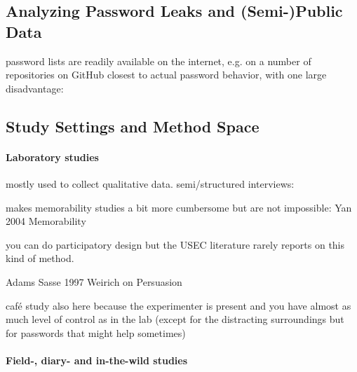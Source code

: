 \subsection{Analyzing Password Leaks and (Semi-)Public Data}
password lists are readily available on the internet, e.g. on a number of repositories on GitHub
closest to actual password behavior, with one large disadvantage: 
\cite{Bonneau2012LinguisticProperties}
\cite{Bonneau2012ScienceOfGuessing}
\cite{Veras2012VisualizingSemanticsPasswords}
\cite{Wash2016UnderstandingPasswordChoices}

\subsection{Study Settings and Method Space}

\paragraph{Laboratory studies}
mostly used to collect qualitative data.
semi/structured interviews: \cite{Stobert2014PasswordLifeCycle}

makes memorability studies a bit more cumbersome but are not impossible:
Yan 2004 Memorability \cite{Yan2004PasswordMemorabilitySecurity}


you can do participatory design \cite{Kuhn1993ParticipatoryDesign} but the USEC literature rarely reports on this kind of method.

Adams Sasse 1997 \cite{Adams1997MakingPWsSecureAndUsable}
Weirich on Persuasion \cite{Weirich2001PrettyGoodPersuasion, Weirich2005PersuasivePasswordSecurity}

café study also here because the experimenter is present and you have almost as much level of control as in the lab (except for the distracting surroundings but for passwords that might help sometimes)
\cite{VonZezschwitz2013SurvivalShortest}

\paragraph{Field-, diary- and in-the-wild studies}

